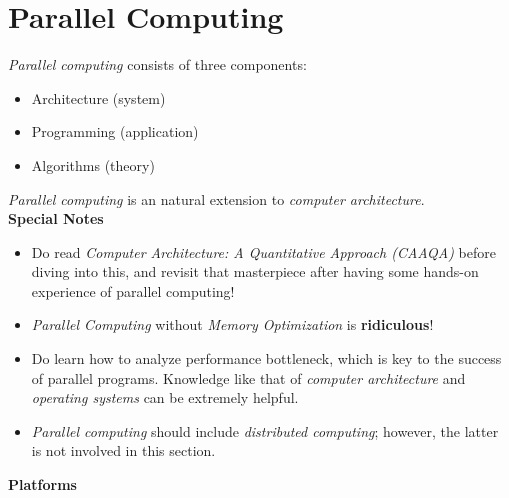 \documentclass{article}
\begin{document}
\section{Parallel Computing}
\emph{Parallel computing} consists of three components:
\begin{itemize}
    \item Architecture (system)
    \item Programming (application)
    \item Algorithms (theory)
\end{itemize}
\emph{Parallel computing} is an natural extension to \emph{computer architecture}.\\
\textbf{Special Notes}
\begin{itemize}
    \item Do read \emph{Computer Architecture: A Quantitative Approach (CAAQA)} before diving into this, and revisit that masterpiece after having some hands-on experience of parallel computing!
    \item \emph{Parallel Computing} without \emph{Memory Optimization} is \textbf{ridiculous}!
    \item Do learn how to analyze performance bottleneck, which is key to the success of parallel programs.
    Knowledge like that of \emph{computer architecture} and \emph{operating systems} can be extremely helpful.
    \item \emph{Parallel computing} should include \emph{distributed computing}; however, the latter is not involved in this section.
\end{itemize}
\textbf{Platforms}
\end{document}
